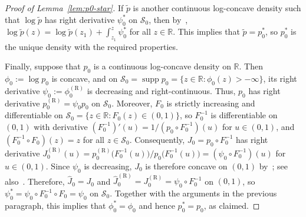 \documentclass[a4paper]{article}
\newcommand{\R}{\mathbb{R}}
\DeclareMathOperator{\supp}{supp}
\theoremstyle{definition}
\begin{document}
\begin{proof}[Proof of Lemma~\ref{lem:p0-star}]
If $\tilde{p}$ is another continuous log-concave density such that $\log\tilde{p}$ has right derivative $\psi_0^*$ on $\mathcal{S}_0$, then by~\citet[Corollary~24.2.1]{rockafellar97convex}, $\log\tilde{p}(z) = \log\tilde{p}(z_1) + \int_{z_1}^z\psi_0^*$ for all $z \in\R$. This implies that $\tilde{p} = p_0^*$, so $p_0^*$ is the unique density with the required properties. 

\medskip
\noindent
Finally, suppose that $p_0$ is a continuous log-concave density on $\R$. Then $\phi_0 := \log p_0$ is concave, and on $\mathcal{S}_0 = \supp p_0 = \{z \in\R : \phi_0(z) > -\infty\}$, its right derivative $\psi_0 := \phi_0^{(\mathrm{R})}$ is decreasing and right-continuous. 
Thus, $p_0$ has right derivative $p_0^{(\mathrm{R})} = \psi_0 p_0$ on $\mathcal{S}_0$. Moreover, $F_0$ is strictly increasing and differentiable on $\mathcal{S}_0 = \{z \in\R : F_0(z) \in (0,1)\}$, so $F_0^{-1}$ is differentiable on $(0,1)$ with derivative $(F_0^{-1})'(u) = 1/(p_0 \circ F_0^{-1})(u)$ for $u \in (0,1)$, and $(F_0^{-1} \circ F_0)(z) = z$ for all $z \in \mathcal{S}_0$. Consequently, $J_0 = p_0 \circ F_0^{-1}$ 
has right derivative $J_0^{(\mathrm{R})}(u) = p_0^{(\mathrm{R})}\bigl(F_0^{-1}(u)\bigr)/p_0\bigl(F_0^{-1}(u)\bigr) = (\psi_0 \circ F_0^{-1})(u)$ for $u \in (0,1)$. Since $\psi_0$ is decreasing, $J_0$ is therefore concave on $(0,1)$ by~\citet[Theorem~24.2]{rockafellar97convex}; see also~\citet[Proposition~A.1(c)]{bobkov1996extremal}. Therefore, $\hat{J}_0 = J_0$ and $\hat{J}_0^{(\mathrm{R})} = J_0^{(\mathrm{R})} = \psi_0 \circ F_0^{-1}$ on $(0,1)$, so $\psi_0^* = \psi_0 \circ F_0^{-1} \circ F_0 = \psi_0$ on $\mathcal{S}_0$. Together with the arguments in the previous paragraph, this implies that $\phi_0^* = \phi_0$ and hence $p_0^* = p_0$, as claimed.
\end{proof}
\end{document}
